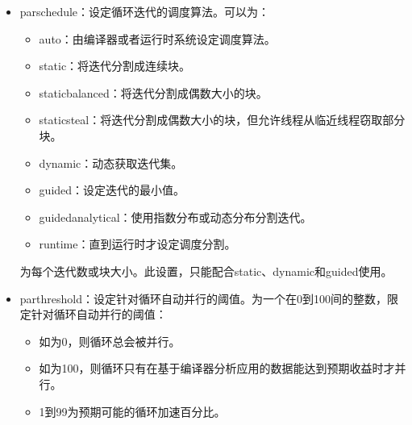 \documentclass[a4paper,12pt,english]{sphinxmanual}
\begin{document}
\begin{itemize}
\item {} 
\sphinxAtStartPar
\sphinxhyphen{}par\sphinxhyphen{}schedule：设定循环迭代的调度算法。可以为：
\begin{itemize}
\item {} 
\sphinxAtStartPar
auto：由编译器或者运行时系统设定调度算法。

\item {} 
\sphinxAtStartPar
static：将迭代分割成连续块。

\item {} 
\sphinxAtStartPar
static\sphinxhyphen{}balanced：将迭代分割成偶数大小的块。

\item {} 
\sphinxAtStartPar
static\sphinxhyphen{}steal：将迭代分割成偶数大小的块，但允许线程从临近线程窃取部分块。

\item {} 
\sphinxAtStartPar
dynamic：动态获取迭代集。

\item {} 
\sphinxAtStartPar
guided：设定迭代的最小值。

\item {} 
\sphinxAtStartPar
guided\sphinxhyphen{}analytical：使用指数分布或动态分布分割迭代。

\item {} 
\sphinxAtStartPar
runtime：直到运行时才设定调度分割。

\end{itemize}

\sphinxAtStartPar
{}为每个迭代数或块大小。此设置，只能配合static、dynamic和guided使用。

\item {} 
\sphinxAtStartPar
\sphinxhyphen{}par\sphinxhyphen{}threshold：设定针对循环自动并行的阈值。为一个在0到100间的整数，限定针对循环自动并行的阈值：
\begin{itemize}
\item {} 
\sphinxAtStartPar
如为0，则循环总会被并行。

\item {} 
\sphinxAtStartPar
如为100，则循环只有在基于编译器分析应用的数据能达到预期收益时才并行。

\item {} 
\sphinxAtStartPar
1到99为预期可能的循环加速百分比。

\end{itemize}


\end{itemize}
\end{document}
